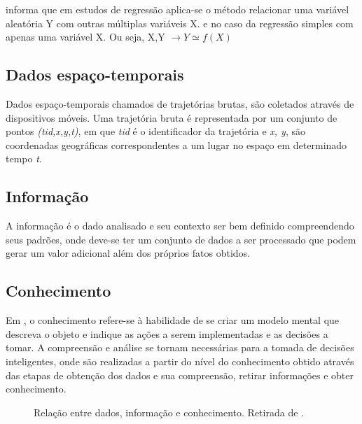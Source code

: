\documentclass[	12pt, Times, openright, twoside, a4paper, english, brazil]{abntex2}
\begin{document}
\cite{Clarice2011} informa que em estudos de regressão aplica-se o método relacionar uma variável aleatória Y com outras múltiplas variáveis X. e no caso da regressão simples com apenas uma variável X. 
Ou seja, X,Y $\rightarrow Y \simeq f(X) $

\subsection{Dados espaço-temporais}
Dados espaço-temporais chamados de trajetórias brutas, são coletados através de dispositivos móveis. Uma trajetória bruta é representada por um conjunto de pontos \textit{(tid,x,y,t)}, em que \textit{tid} é o identificador da trajetória e \textit{x, y}, são coordenadas geográficas correspondentes a um lugar no espaço em determinado tempo \textit{t}.

\subsection{Informação}
A informação é o dado analisado e seu contexto ser bem definido compreendendo seus padrões, onde deve-se ter um conjunto de dados a ser processado que podem gerar um valor adicional além dos próprios fatos obtidos.

\subsection{Conhecimento}
Em \cite{Rezende2003}, o conhecimento refere-se à habilidade de se criar um modelo mental que descreva o objeto e indique as ações a serem implementadas e as decisões a tomar. A compreensão e análise se tornam necessárias para a tomada de decisões inteligentes, onde são realizadas a partir do nível do conhecimento obtido através das etapas de obtenção dos dados e sua compreensão, retirar informações e obter conhecimento.\\

\begin{figure}[htb]
\caption{Relação entre dados, informação e conhecimento. Retirada de \cite{Rezende2003}.\label{fig:relação}}
\end{figure}
\end{document}
